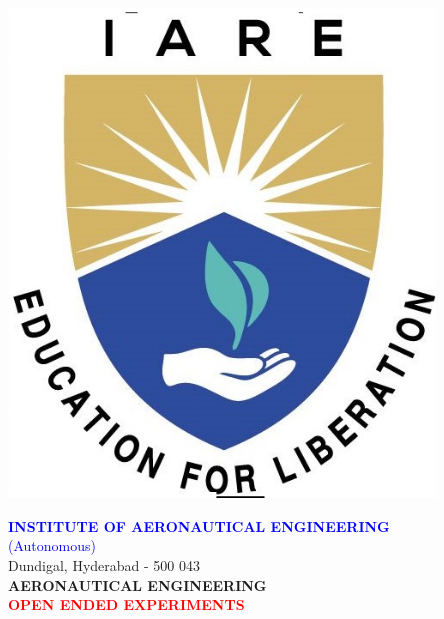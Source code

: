 \documentclass[11pt,paper=a4,answers]{exam}
\begin{document}
	\begin{minipage}{\linewidth}
		\begin{minipage}{0.14\linewidth}%
			\includegraphics[width=0.85\textwidth]{iare.png}\end{minipage}
		\begin{minipage}[r]{0.86\textwidth}%
			\noindent
			\begin{center}	
				\textcolor{blue}{\Large \bfseries INSTITUTE OF AERONAUTICAL ENGINEERING}\\
				\textcolor{blue}{\Large (Autonomous)} \\
				\small Dundigal, Hyderabad - 500 043 \\  [3pt] 
				\vspace{5pt}
				\large \bfseries AERONAUTICAL ENGINEERING \\\vspace{5pt}
				\textcolor{red}{\large \bfseries OPEN ENDED EXPERIMENTS} \\\vspace{3pt}
			\end{center}
		\end{minipage}
	\end{minipage}
\end{document}
